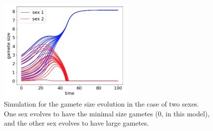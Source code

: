 \begin{figure}
    \centering
    \includegraphics[width = 0.6\textwidth]{vickysFigs/2_sex_run1.png}
    \caption{Simulation for the gamete size evolution in the case of two sexes. One sex evolves to have the minimal size gametes (0, in this model), and the other sex evolves to have large gametes.}
    \label{fig:my_label}
\end{figure}